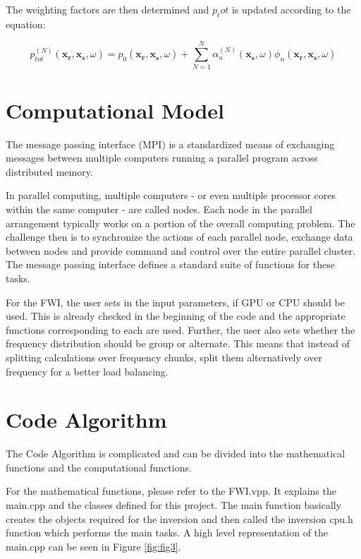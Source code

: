 \documentclass[10pt,a4paper]{article}
\begin{document}
The weighting factors are then determined and $p_tot$ is updated according to the equation: 

\begin{equation} \label{eq:eq32} p^{(N)}_{tot} (\mathbf{x_\text{r}},\mathbf{x_\text{s}},\omega) =  p_0 (\mathbf{x_\text{r}},\mathbf{x_\text{s}},\omega) + \sum\limits_{N=1}^N \alpha^{(N)}_n (\mathbf{x_\text{s}},\omega) \phi_n (\mathbf{x_\text{r}},\mathbf{x_\text{s}},\omega) \end{equation} 

\section{Computational Model}
The message passing interface (MPI) is a standardized means of exchanging messages between multiple computers running a parallel program across distributed memory.

In parallel computing, multiple computers - or even multiple processor cores within the same computer - are called nodes.  Each node in the parallel arrangement typically works on a portion of the overall computing problem. The challenge then is to synchronize the actions of each parallel node, exchange data between nodes and provide command and control over the entire parallel cluster. The message passing interface defines a standard suite of functions for these tasks.

For the FWI, the user sets in the input parameters, if GPU or CPU should be used. This is already checked in the beginning of the code and the appropriate functions corresponding to each are used. Further, the user also sets whether the frequency distribution should be group or alternate. This means that instead of splitting calculations over frequency chunks, split them alternatively over frequency for a better load balancing. 


\section{Code Algorithm}

The Code Algorithm is complicated and can be divided into the mathematical functions and the computational functions. 

For the mathematical functions, please refer to the FWI.vpp. It explains the main.cpp and the classes defined for this project. The main function basically creates the objects required for the inversion and then called the inversion cpu.h function which performs the main tasks. A high level representation of the main.cpp can be seen in Figure \ref{fig:fig3}.
\end{document}
